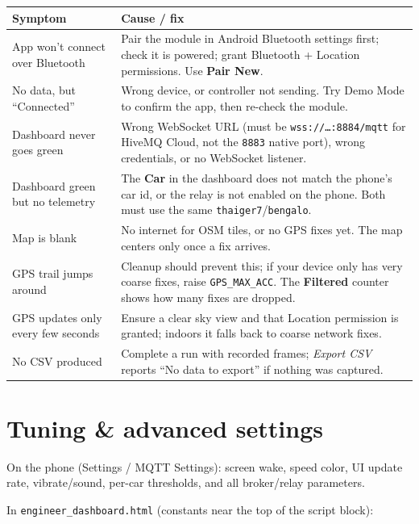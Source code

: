 \documentclass[11pt,a4paper,oneside]{report}
\newcommand{\code}[1]{\texttt{#1}}
\begin{document}
\begin{tabularx}{\linewidth}{@{}LL@{}}
\toprule
\textbf{Symptom} & \textbf{Cause / fix}\\
\midrule
App won't connect over Bluetooth & Pair the module in Android Bluetooth settings first; check it is powered; grant Bluetooth + Location permissions. Use \textbf{Pair New}.\\
No data, but ``Connected'' & Wrong device, or controller not sending. Try Demo Mode to confirm the app, then re-check the module.\\
Dashboard never goes green & Wrong WebSocket URL (must be \code{wss://\ldots:8884/mqtt} for HiveMQ Cloud, not the \code{8883} native port), wrong credentials, or no WebSocket listener.\\
Dashboard green but no telemetry & The \textbf{Car} in the dashboard does not match the phone's car id, or the relay is not enabled on the phone. Both must use the same \code{thaiger7}/\code{bengalo}.\\
Map is blank & No internet for OSM tiles, or no GPS fixes yet. The map centers only once a fix arrives.\\
GPS trail jumps around & Cleanup should prevent this; if your device only has very coarse fixes, raise \code{GPS\_MAX\_ACC}. The \textbf{Filtered} counter shows how many fixes are dropped.\\
GPS updates only every few seconds & Ensure a clear sky view and that Location permission is granted; indoors it falls back to coarse network fixes.\\
No CSV produced & Complete a run with recorded frames; \emph{Export CSV} reports ``No data to export'' if nothing was captured.\\
\bottomrule
\end{tabularx}

\section{Tuning \& advanced settings}
On the phone (Settings / MQTT Settings): screen wake, speed color, UI update rate,
vibrate/sound, per-car thresholds, and all broker/relay parameters.

\medskip
\noindent In \code{engineer\_dashboard.html} (constants near the top of the script
block):
\end{document}
